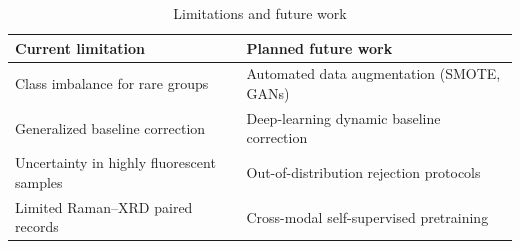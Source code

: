 \begin{table}[htbp]
\caption{Limitations and future work}
\label{tab:limitations}
\centering
\begin{tabular}{ll}
\toprule
\textbf{Current limitation} & \textbf{Planned future work} \\
\midrule
Class imbalance for rare groups & Automated data augmentation (SMOTE, GANs) \\
Generalized baseline correction & Deep-learning dynamic baseline correction \\
Uncertainty in highly fluorescent samples & Out-of-distribution rejection protocols \\
Limited Raman--XRD paired records & Cross-modal self-supervised pretraining \\
\bottomrule
\end{tabular}
\end{table}
